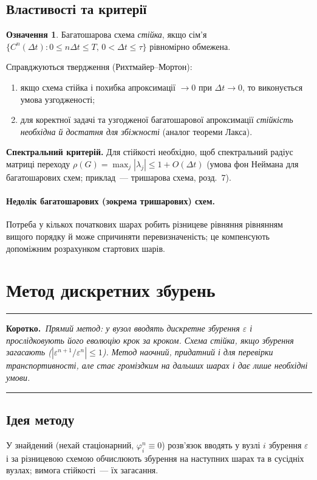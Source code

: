 \documentclass[12pt,a4paper]{article}
\theoremstyle{definition}
\newtheorem{ozn}{Означення}[section]
\theoremstyle{plain}
\newenvironment{korotko}
  {\par\medskip\noindent\begingroup\color{accent!75!black}\rule{\linewidth}{0.4pt}\par
   \noindent\textbf{Коротко.}\itshape\,}
  {\par\noindent\rule{\linewidth}{0.4pt}\endgroup\medskip}
\newcommand{\abs}[1]{\left\lvert #1 \right\rvert}
\begin{document}
\subsection{Властивості та критерії}
\begin{ozn}
Багатошарова схема \emph{стійка}, якщо сім'я $\{C^n(\Delta t):0\le n\Delta t\le T,\,0<\Delta t\le\tau\}$
рівномірно обмежена.
\end{ozn}
Справджуються твердження (Рихтмайер--Мортон):
\begin{enumerate}[leftmargin=1.6em]
  \item якщо схема стійка і похибка апроксимації $\to0$ при $\Delta t\to0$,
  то виконується умова узгодженості;
  \item для коректної задачі та узгодженої багатошарової апроксимації
  \emph{стійкість необхідна й достатня для збіжності} (аналог теореми
  Лакса).
\end{enumerate}
\textbf{Спектральний критерій.} Для стійкості необхідно, щоб
спектральний радіус матриці переходу
$\rho(G)=\max_j\abs{\lambda_j}\le1+O(\Delta t)$ (умова фон Неймана для
багатошарових схем; приклад~--- тришарова схема, розд.~7).

\paragraph{Недолік багатошарових (зокрема тришарових) схем.} Потреба у
кількох початкових шарах робить різницеве рівняння рівнянням вищого
порядку й може спричиняти перевизначеність; це компенсують допоміжним
розрахунком стартових шарів.

\newpage
\section{Метод дискретних збурень}

\begin{korotko}
Прямий метод: у вузол вводять дискретне збурення $\varepsilon$ і
прослідковують його еволюцію крок за кроком. Схема стійка, якщо збурення
\emph{загасають} ($\abs{\varepsilon^{n+1}/\varepsilon^{n}}\le1$). Метод
наочний, придатний і для перевірки \emph{транспортивності}, але стає
громіздким на дальших шарах і дає лише необхідні умови.
\end{korotko}

\subsection{Ідея методу}
У знайдений (нехай стаціонарний, $\varphi_i^n\equiv0$) розв'язок вводять
у вузлі $i$ збурення $\varepsilon$ і за різницевою схемою обчислюють
збурення на наступних шарах та в сусідніх вузлах; вимога стійкості~---
їх загасання.
\end{document}
